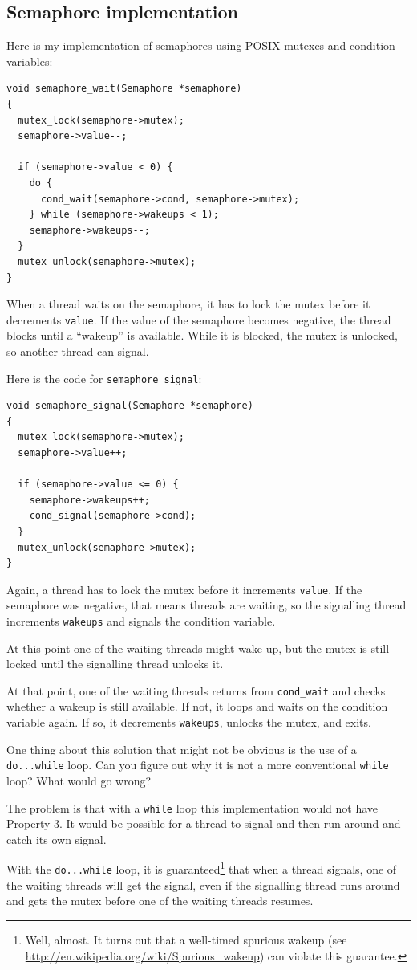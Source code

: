 \documentclass[12pt]{book}
\begin{document}
\subsection{Semaphore implementation}

Here is my implementation of semaphores using POSIX mutexes
and condition variables:

\begin{verbatim}
void semaphore_wait(Semaphore *semaphore)
{
  mutex_lock(semaphore->mutex);
  semaphore->value--;

  if (semaphore->value < 0) {
    do {
      cond_wait(semaphore->cond, semaphore->mutex);
    } while (semaphore->wakeups < 1);
    semaphore->wakeups--;
  }
  mutex_unlock(semaphore->mutex);
}
\end{verbatim}

When a thread waits on the semaphore, it has to lock the mutex
before it decrements {\tt value}.  If the value of the semaphore
becomes negative, the thread blocks until a ``wakeup'' is
available.  While it is blocked, the mutex is unlocked, so another
thread can signal.

Here is the code for \verb"semaphore_signal":

\begin{verbatim}
void semaphore_signal(Semaphore *semaphore)
{
  mutex_lock(semaphore->mutex);
  semaphore->value++;

  if (semaphore->value <= 0) {
    semaphore->wakeups++;
    cond_signal(semaphore->cond);
  }
  mutex_unlock(semaphore->mutex);
}
\end{verbatim}

Again, a thread has to lock the mutex before it increments
{\tt value}.  If the semaphore was negative, that means threads
are waiting, so the signalling thread increments {\tt wakeups} and
signals the condition variable.

At this point one of the waiting threads might wake up, but the
mutex is still locked until the signalling thread unlocks it.

At that point, one of the waiting threads returns from \verb"cond_wait"
and checks whether a wakeup is still available.  If not, it
loops and waits on the condition variable again.  If so, it
decrements {\tt wakeups}, unlocks the mutex, and exits.

One thing about this solution that might not be obvious is the use of
a {\tt do...while} loop.  Can you figure out why it is not a
more conventional {\tt while} loop?  What would go wrong?

The problem is that with a {\tt while} loop this implementation would
not have Property 3.  It would be possible for a thread to signal and
then run around and catch its own signal.

With the {\tt do...while} loop, it is guaranteed\footnote{Well,
  almost.  It turns out that a well-timed spurious wakeup (see
  \url{http://en.wikipedia.org/wiki/Spurious_wakeup}) can violate this
  guarantee.} that when a thread signals, one of the waiting threads
will get the signal, even if the signalling thread runs around and
gets the mutex before one of the waiting threads resumes.
\end{document}
